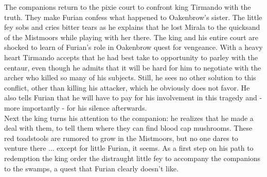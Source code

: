 The companions return to the pixie court to confront king Tirmando with the truth. They make Furian confess what happened to Oakenbrow's sister. The little fey sobs and cries bitter tears as he explains that he lost Mirala to the quicksand of the Mistmoors while playing with her there. The king and his entire court are shocked to learn of Furian's role in Oakenbrow quest for vengeance. With a heavy heart Tirmando accepts that he had best take to opportunity to parley with the centaur, even though he admits that it will be hard for him to negotiate with the archer who killed so many of his subjects. Still, he sees no other solution to this conflict, other than killing his attacker, which he obviously does not favor. He also tells Furian that he will have to pay for his involvement in this tragedy and - more importantly - for his silence afterwards.\\

Next the king turns his attention to the companion: he realizes that he made a deal with them, to tell them where they can find blood cap mushrooms. These red toadstools are rumored to grow in the Mistmoors, but no one dares to venture there ... except for little Furian, it seems. As a first step on his path to redemption the king order the distraught little fey to accompany the companions to the swamps, a quest that Furian clearly doesn't like.\\

